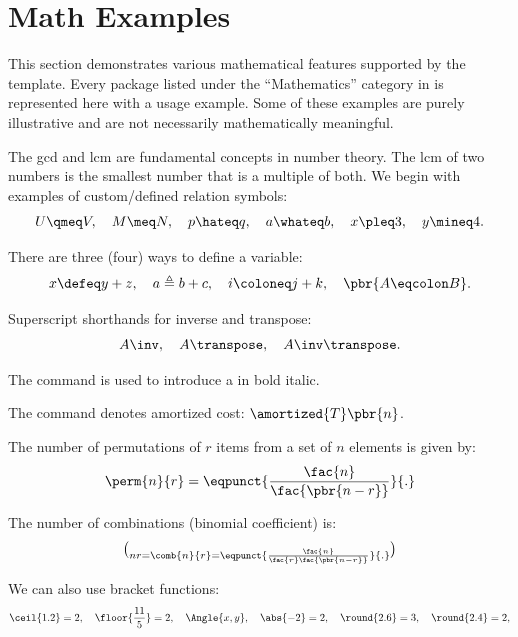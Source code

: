 \section{Math Examples}
\label{sec:math}

This section demonstrates various mathematical features supported by the template. Every package listed under the \enquote{Mathematics} category in  is represented here with a usage example. Some of these examples are purely illustrative and are not necessarily mathematically meaningful.

The \gls{gcd} and \gls{lcm} are fundamental concepts in number theory. The \gls{lcm} of two numbers is the smallest number that is a multiple of both. We begin with examples of custom\-/defined relation symbols:
\begin{equation*}
  U \qmeq V,
  \quad M \meq N,
  \quad p \hateq q,
  \quad a \whateq b,
  \quad x \pleq 3,
  \quad y \mineq 4.
\end{equation*}

There are three (four) ways to define a variable:
\begin{equation*}
  x \defeq y + z,
  \quad a \triangleq b + c,
  \quad i \coloneq j + k,
  \quad \pbr{A \eqcolon B}.
\end{equation*}

Superscript shorthands for inverse and transpose:
\begin{equation*}
  A\inv,
  \quad A\transpose,
  \quad {A\inv}\transpose.
\end{equation*}

The  command is used to introduce a  in bold italic.

The  command denotes amortized cost: $\amortized{T}\pbr{n}$.

The number of permutations of $r$ items from a set of $n$ elements is given by:
\begin{equation*}
  \perm{n}{r} = \eqpunct{\frac{\fac{n}}{\fac{\pbr{n - r}}}}{.}
\end{equation*}

The number of combinations (binomial coefficient) is:
\begin{equation*}
  \choose{n}{r} = \comb{n}{r} = \eqpunct{\frac{\fac{n}}{\fac{r}\fac{\pbr{n - r}}}}{.}
\end{equation*}

We can also use bracket functions:
\begin{equation*}
  \ceil{1.2} = 2,
  \quad \floor{\frac{11}{5}} = 2,
  \quad \Angle{x, y},
  \quad \abs{-2} = 2,
  \quad \round{2.6} = 3,
  \quad \round{2.4} = 2,
\end{equation*}


